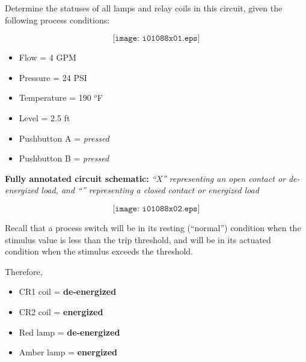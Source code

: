 

Determine the statuses of all lamps and relay coils in this circuit, given the following process conditions:

$$\texttt{[image: i01088x01.eps]}$$

\begin{itemize}
\item{} Flow = 4 GPM
\item{} Pressure = 24 PSI
\item{} Temperature = 190 $^{o}$F
\item{} Level = 2.5 ft
\item{} Pushbutton A = {\it pressed}
\item{} Pushbutton B = {\it pressed}
\end{itemize}







\noindent
{\bf Fully annotated circuit schematic:}  {\it ``X'' representing an open contact or de-energized load, and ``'' representing a closed contact or energized load}

$$\texttt{[image: i01088x02.eps]}$$

Recall that a process switch will be in its resting (``normal'') condition when the stimulus value is less than the trip threshold, and will be in its actuated condition when the stimulus exceeds the threshold.

\vskip 10pt

Therefore,
 
\begin{itemize}
\item{} CR1 coil = {\bf de-energized}
\item{} CR2 coil = {\bf energized}
\item{} Red lamp = {\bf de-energized}
\item{} Amber lamp = {\bf energized} 
\end{itemize}










